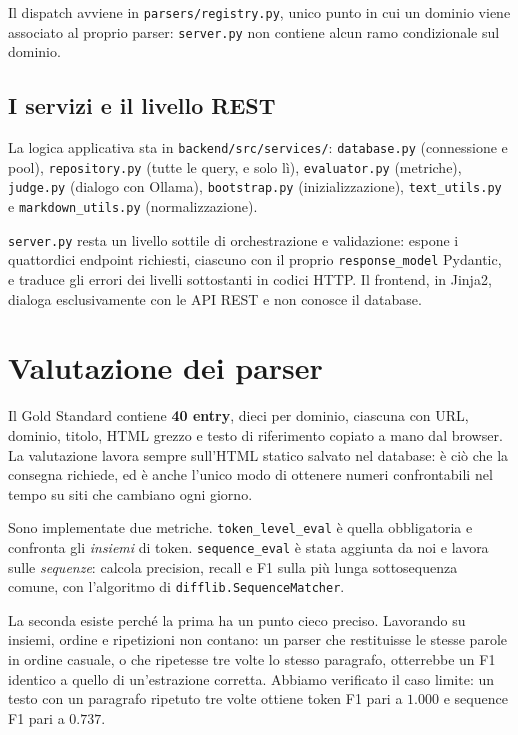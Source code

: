 \documentclass[10pt,a4paper,twocolumn]{article}
\begin{document}
Il dispatch avviene in \texttt{parsers/registry.py}, unico punto in cui un
dominio viene associato al proprio parser: \texttt{server.py} non contiene
alcun ramo condizionale sul dominio.

\subsection*{I servizi e il livello REST}

La logica applicativa sta in \texttt{backend/src/services/}:
\texttt{database.py} (connessione e pool), \texttt{repository.py} (tutte le
query, e solo lì), \texttt{evaluator.py} (metriche), \texttt{judge.py}
(dialogo con Ollama), \texttt{bootstrap.py} (inizializzazione),
\texttt{text\_utils.py} e \texttt{markdown\_utils.py} (normalizzazione).

\texttt{server.py} resta un livello sottile di orchestrazione e validazione:
espone i quattordici endpoint richiesti, ciascuno con il proprio
\texttt{response\_model} Pydantic, e traduce gli errori dei livelli
sottostanti in codici HTTP. Il frontend, in Jinja2, dialoga esclusivamente con
le API REST e non conosce il database.

\section{Valutazione dei parser}
\label{sec:parser}

Il Gold Standard contiene \textbf{40 entry}, dieci per dominio, ciascuna con
URL, dominio, titolo, HTML grezzo e testo di riferimento copiato a mano dal
browser. La valutazione lavora sempre sull'HTML statico salvato nel database:
è ciò che la consegna richiede, ed è anche l'unico modo di ottenere numeri
confrontabili nel tempo su siti che cambiano ogni giorno.

Sono implementate due metriche. \texttt{token\_level\_eval} è quella
obbligatoria e confronta gli \emph{insiemi} di token. \texttt{sequence\_eval} è
stata aggiunta da noi e lavora sulle \emph{sequenze}: calcola precision,
recall e F1 sulla più lunga sottosequenza comune, con l'algoritmo di
\texttt{difflib.SequenceMatcher}.

La seconda esiste perché la prima ha un punto cieco preciso. Lavorando su
insiemi, ordine e ripetizioni non contano: un parser che restituisse le stesse
parole in ordine casuale, o che ripetesse tre volte lo stesso paragrafo,
otterrebbe un F1 identico a quello di un'estrazione corretta. Abbiamo
verificato il caso limite: un testo con un paragrafo ripetuto tre volte ottiene
token F1 pari a $1.000$ e sequence F1 pari a $0.737$.
\end{document}
